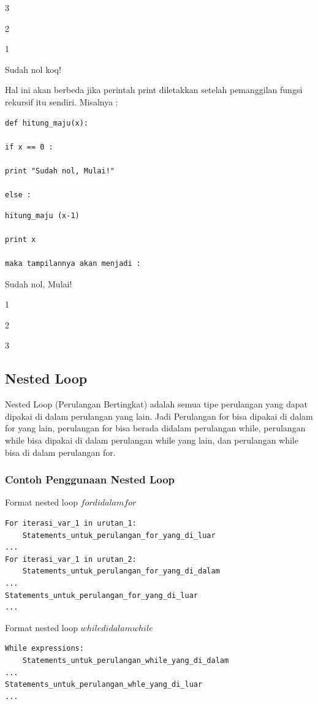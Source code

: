 3

2

1

Sudah nol koq!

Hal ini akan berbeda jika perintah print diletakkan setelah pemanggilan fungsi rekursif itu sendiri. Misalnya :
\begin{verbatim}
def hitung_maju(x):

if x == 0 :

print "Sudah nol, Mulai!"

else :

 \end{verbatim}
 
 
 \begin{verbatim}
hitung_maju (x-1)

print x

maka tampilannya akan menjadi :
 \end{verbatim}
Sudah nol, Mulai!

1

2

3

 

\subsection{Nested Loop}
Nested Loop (Perulangan Bertingkat) adalah semua tipe perulangan yang dapat dipakai di dalam perulangan yang lain. Jadi Perulangan for bisa dipakai di dalam for yang lain, perulangan for bisa berada didalam perulangan while, perulangan while bisa dipakai di dalam perulangan while yang lain, dan perulangan while bisa di dalam perulangan for.

\subsubsection{Contoh Penggunaan Nested Loop}
Format nested loop \(for di dalam for\)
\begin{verbatim}
For iterasi_var_1 in urutan_1:
	Statements_untuk_perulangan_for_yang_di_luar
...
For iterasi_var_1 in urutan_2:
	Statements_untuk_perulangan_for_yang_di_dalam
...
Statements_untuk_perulangan_for_yang_di_luar
...
\end{verbatim}

Format nested loop \(while di dalam while\)
\begin{verbatim}
While expressions:
	Statements_untuk_perulangan_while_yang_di_dalam
...
Statements_untuk_perulangan_whle_yang_di_luar
...
\end{verbatim}

